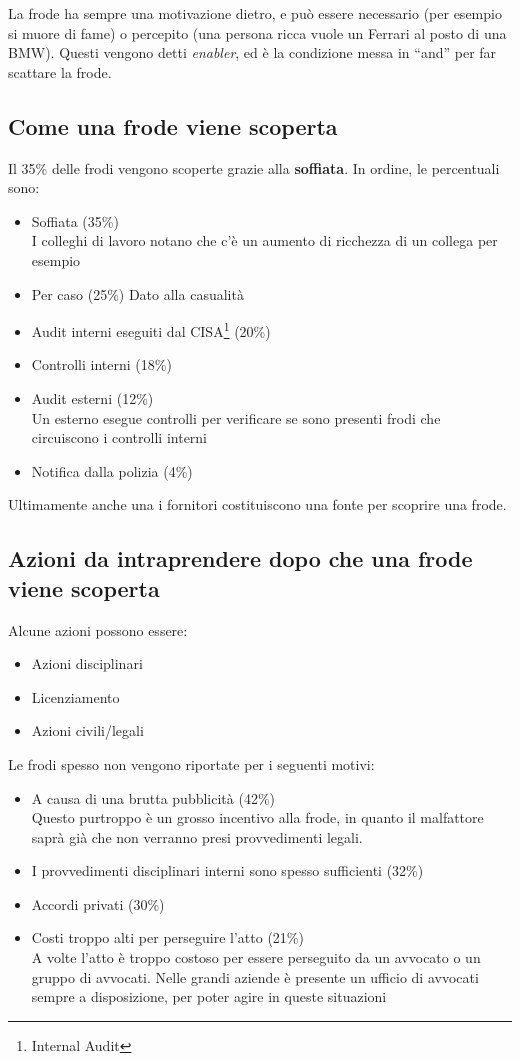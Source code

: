 La frode ha sempre una motivazione dietro, e può essere necessario (per esempio 
si muore di fame) o percepito (una persona ricca vuole un Ferrari al posto di 
una BMW). Questi vengono detti \textit{enabler}, ed è la condizione messa in 
``and'' per far scattare la frode.

\subsection{Come una frode viene scoperta}

Il 35\% delle frodi vengono scoperte grazie alla \textbf{soffiata}. In ordine, 
le percentuali sono:
\begin{itemize}
	\item Soffiata (35\%) \\
	I colleghi di lavoro notano che c'è un aumento di ricchezza di un collega per 
	esempio
	\item Per caso (25\%)
	Dato alla casualità
	\item Audit interni eseguiti dal CISA\footnote{Internal Audit} (20\%)
	\item Controlli interni (18\%)
	\item Audit esterni (12\%) \\
	Un esterno esegue controlli per verificare se sono presenti frodi che 
	circuiscono i controlli interni
	\item Notifica dalla polizia (4\%)
\end{itemize}

Ultimamente anche una i fornitori costituiscono una fonte per scoprire una 
frode.

\subsection{Azioni da intraprendere dopo che una frode viene scoperta}

Alcune azioni possono essere:
\begin{itemize}
	\item Azioni disciplinari
	\item Licenziamento
	\item Azioni civili/legali
\end{itemize}

Le frodi spesso non vengono riportate per i seguenti motivi:
\begin{itemize}
	\item A causa di una brutta pubblicità (42\%) \\
	Questo purtroppo è un grosso incentivo alla frode, in quanto il malfattore 
	saprà già che non verranno presi provvedimenti legali.
	\item I provvedimenti disciplinari interni sono spesso sufficienti (32\%)
	\item Accordi privati (30\%)
	\item Costi troppo alti per perseguire l'atto (21\%) \\
	A volte l'atto è troppo costoso per essere perseguito da un avvocato o un 
	gruppo di avvocati. Nelle grandi aziende è presente un ufficio di avvocati 
	sempre a disposizione, per poter agire in queste situazioni
\end{itemize}

